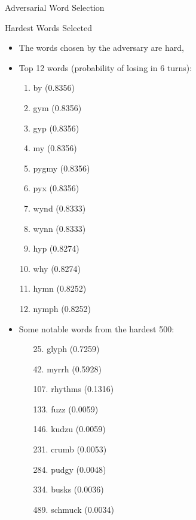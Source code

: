 \documentclass[final]{beamer}
\begin{document}
{\begin{frame}{}
\begin{center}
\begin{columns}[t]
\begin{column}{0.32\textwidth}
\begin{block}{\huge Adversarial Word Selection}
    \end{block}

\vspace{1.5cm}

    \begin{block}{\huge Hardest Words Selected}

\vspace{.5cm}
\begin{itemize}
\item The words chosen by the adversary are hard,
\item Top 12 words {\color{orange}(probability of losing in 6 turns)}:
\begin{multicols}{3}
\begin{enumerate}
\item by {\color{orange} (0.8356)}
\item gym {\color{orange} (0.8356)}
\item gyp {\color{orange} (0.8356)}
\item my {\color{orange} (0.8356)}
\item pygmy {\color{orange} (0.8356)}
\item pyx {\color{orange} (0.8356)}
\item wynd {\color{orange} (0.8333)}
\item wynn {\color{orange} (0.8333)}
\item hyp {\color{orange} (0.8274)}
\item why {\color{orange} (0.8274)}
\item hymn {\color{orange} (0.8252)}
\item nymph {\color{orange} (0.8252)}
\end{enumerate}
\end{multicols}
\item Some notable words from the hardest 500:
\begin{multicols}{3}
\begin{enumerate}
\item[25.] glyph {\color{orange} (0.7259)}
\item[42.] myrrh {\color{orange} (0.5928)}
\item[107.] rhythms  {\color{orange} (0.1316)}
\item[133.] fuzz  {\color{orange} (0.0059)}
\item[146.] kudzu {\color{orange} (0.0059)}
\item[231.] crumb {\color{orange} (0.0053)}
\item[284.] pudgy {\color{orange} (0.0048)}
\item[334.] busks {\color{orange} (0.0036)}
\item[489.] schmuck {\color{orange} (0.0034)}
\end{enumerate}
\end{multicols}
\end{itemize}


\end{block}
\end{column}
\end{columns}
\end{center}
\end{frame}}
\end{document}
